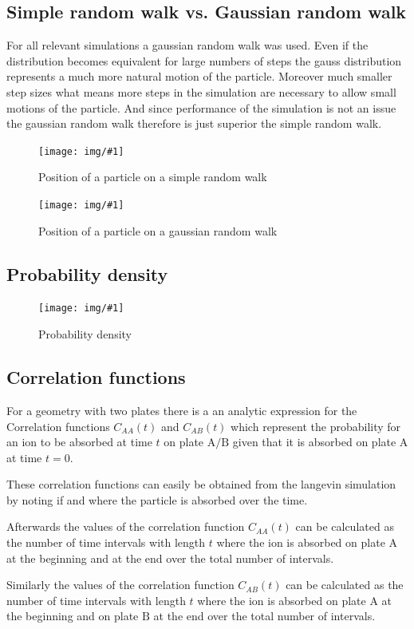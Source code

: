 \documentclass[a4paper, parskip=half]{scrartcl}
\newcommand{\myImage}[2]{
	\begin{figure}[H]
	\centering
	\texttt{[image: img/\#1]}
	\caption{#2}
	\label{pic:#1}
	\end{figure}
}
\begin{document}
\subsection{Simple random walk vs. Gaussian random walk}

For all relevant simulations a gaussian random walk was used. Even if the distribution becomes equivalent for large numbers of steps the gauss distribution represents a much more natural motion of the particle. Moreover much smaller step sizes what means more steps in the simulation are necessary to allow small motions of the particle. And since performance of the simulation is not an issue the gaussian random walk therefore is just superior the simple random walk.

\myImage{fixed_pos}{Position of a particle on a simple random walk}

\myImage{gauss_pos}{Position of a particle on a gaussian random walk}




\subsection{Probability density}
\myImage{probability_density}{Probability density}

\subsection{Correlation functions}
For a geometry with two plates there is a an analytic expression for the Correlation functions $C_{AA}(t)$ and $C_{AB}(t)$ which represent the probability for an ion to be absorbed at time $t$ on plate $\mathrm{A}/\mathrm{B}$ given that it is absorbed on plate $\mathrm{A}$ at time $t=0$.

These correlation functions can easily be obtained from the langevin simulation by noting if and where the particle is absorbed over the time. 

Afterwards the values of the correlation function $C_{AA}(t)$ can be calculated as the number of time intervals with length $t$ where the ion is absorbed on plate $\mathrm{A}$ at the beginning and at the end over the total number of intervals.

Similarly the values of the correlation function $C_{AB}(t)$ can be calculated as the number of time intervals with length $t$ where the ion is absorbed on plate $\mathrm{A}$ at the beginning and on plate $\mathrm{B}$ at the end over the total number of intervals.
\end{document}
